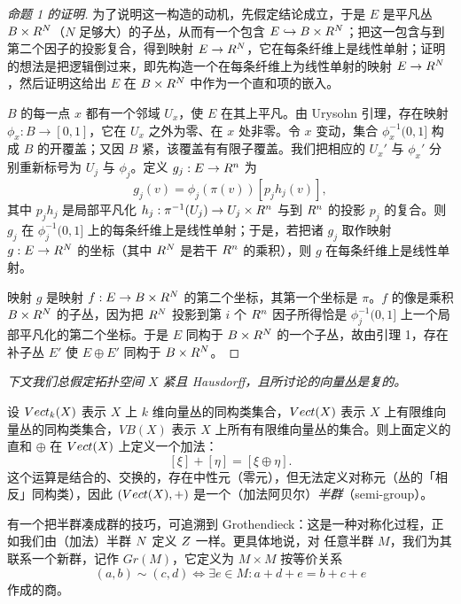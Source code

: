 \begin{proof}[命题 1 的证明]
为了说明这一构造的动机，先假定结论成立，于是 $E$ 是平凡丛 $B\times R^N$（$N$ 足够大）的子丛，从而有一个包含 $E\hookrightarrow B\times R^N$；把这一包含与到第二个因子的投影复合，得到映射 $E\to R^N$，它在每条纤维上是线性单射；证明的想法是把逻辑倒过来，即先构造一个在每条纤维上为线性单射的映射 $E\to R^N$，然后证明这给出 $E$ 在 $B\times R^N$ 中作为一个直和项的嵌入。

$B$ 的每一点 $x$ 都有一个邻域 $U_x$，使 $E$ 在其上平凡。由 Urysohn 引理，存在映射 $\phi_x: B\to[0,1]$，它在 $U_x$ 之外为零、在 $x$ 处非零。令 $x$ 变动，集合 $\phi_x^{-1}(0,1]$ 构成 $B$ 的开覆盖；又因 $B$ 紧，该覆盖有有限子覆盖。我们把相应的 $U_x'$ 与 $\phi_x'$ 分别重新标号为 $U_j$ 与 $\phi_j$。定义 $g_j: E\to R^n$ 为
\[ g_j(v)=\phi_j(\pi(v))[p_jh_j(v)], \]
其中 $p_jh_j$ 是局部平凡化 $h_j: \pi^{-1}(U_j)\to U_j\times R^n$ 与到 $R^n$ 的投影 $p_j$ 的复合。则 $g_j$ 在 $\phi_j^{-1}(0,1]$ 上的每条纤维上是线性单射；于是，若把诸 $g_j$ 取作映射 $g: E\to R^N$ 的坐标（其中 $R^N$ 是若干 $R^n$ 的乘积），则 $g$ 在每条纤维上是线性单射。

映射 $g$ 是映射 $f: E\to B\times R^N$ 的第二个坐标，其第一个坐标是 $\pi$。$f$ 的像是乘积 $B\times R^N$ 的子丛，因为把 $R^N$ 投影到第 $i$ 个 $R^n$ 因子所得恰是 $\phi_j^{-1}(0,1]$ 上一个局部平凡化的第二个坐标。于是 $E$ 同构于 $B\times R^N$ 的一个子丛，故由引理 1，存在补子丛 $E'$ 使 $E\oplus E'$ 同构于 $B\times R^N$。
\end{proof}


\emph{下文我们总假定拓扑空间 $X$ 紧且 Hausdorff，且所讨论的向量丛是复的。}

设 $Vect_k(X)$ 表示 $X$ 上 $k$ 维向量丛的同构类集合，$Vect(X)$ 表示 $X$ 上有限维向量丛的同构类集合，$VB(X)$ 表示 $X$ 上所有有限维向量丛的集合。则上面定义的直和 $\oplus$ 在 $Vect(X)$ 上定义一个加法：
\[ [\xi]+[\eta]=[\xi\oplus\eta]. \]
这个运算是结合的、交换的，存在中性元（零元），但无法定义对称元（丛的「相反」同构类），因此 $(Vect(X),+)$ 是一个（加法阿贝尔）\emph{半群}（semi-group）。

有一个把半群凑成群的技巧，可追溯到 Grothendieck：这是一种对称化过程，正如我们由（加法）半群 $N$ 定义 $Z$ 一样。更具体地说，对
任意半群 $M$，我们为其联系一个新群，记作 $Gr(M)$，它定义为 $M\times M$ 按等价关系
\[ (a,b)\sim(c,d)\iff\exists e\in M : a+d+e=b+c+e \]
作成的商。

